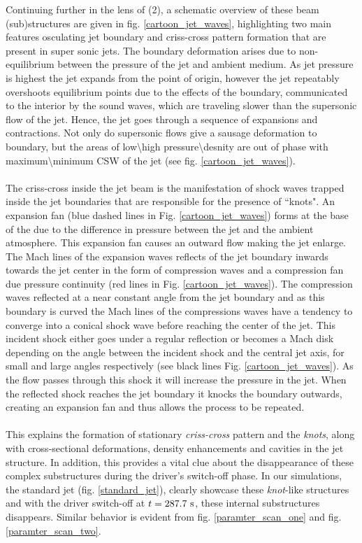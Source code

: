 \documentclass[12pt]{ociamthesis}
\newcommand{\fref}[1]{fig. \ref{#1}}
\newcommand{\np}{\\ \\}
\begin{document}
Continuing further in the lens of (2), a schematic overview of these beam (sub)structures are given in fig. \ref{cartoon_jet_waves}, highlighting two main features osculating jet boundary and criss-cross pattern formation that are present in super sonic jets. The boundary deformation arises due to non-equilibrium between the pressure of the jet and ambient medium. As jet pressure is highest the jet expands from the point of origin, however the jet repeatably overshoots equilibrium points due to the effects of the boundary, communicated to the interior by the sound waves, which are traveling slower than the supersonic flow of the jet. Hence, the jet goes through a sequence of expansions and contractions. Not only do supersonic flows give a sausage deformation to boundary, but the areas of low\textbackslash high pressure\textbackslash desnity are out of phase with maximum\textbackslash minimum CSW of the jet (see fig. \ref{cartoon_jet_waves}). \np  
%
The criss-cross inside the jet beam is the manifestation of shock waves trapped inside the jet boundaries that are responsible for the presence of ``knots". An expansion fan (blue dashed lines in Fig. \eqref{cartoon_jet_waves}) forms at the base of the due to the difference in pressure between the jet and the ambient atmosphere. This expansion fan causes an outward flow making the jet enlarge. The Mach lines of the expansion waves reflects of the jet boundary inwards towards the jet center in the form of compression waves and a compression fan due pressure continuity (red lines in Fig. \eqref{cartoon_jet_waves}). The compression waves reflected at a near constant angle from the jet boundary and as this boundary is curved the Mach lines of the compressions waves have a tendency to converge into a conical shock wave before reaching the center of the jet. This incident shock either goes under a regular reflection or becomes a Mach disk depending on the angle between the incident shock and the central jet axis, for small and large angles respectively (see black lines Fig. \eqref{cartoon_jet_waves}). As the flow passes through this shock it will increase the pressure in the jet. When the reflected shock reaches the jet boundary it knocks the boundary outwards, creating an expansion fan and thus allows the process to be repeated. \np
%
This explains the formation of stationary \textit{criss-cross} pattern and the \textit{knots}, along with cross-sectional deformations, density enhancements and cavities in the jet structure. In addition, this provides a vital clue about the disappearance of these complex substructures during the driver’s switch-off phase. In our simulations, the standard jet (\fref{standard_jet}), clearly showcase these \textit{knot}-like structures and with the driver switch-off at $t=287.7~\rm{s}$, these internal substructures disappears. Similar behavior is evident from \fref{paramter_scan_one} and \fref{paramter_scan_two}.  
\end{document}
